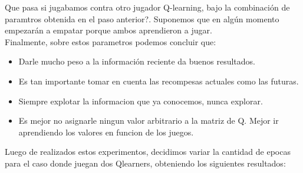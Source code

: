 Que pasa si jugabamos contra otro jugador Q-learning, bajo la combinación de paramtros obtenida en el paso anterior?.
 Suponemos que en algún momento empezarán a empatar porque ambos aprendieron a jugar.\\

Finalmente, sobre estos parametros podemos concluir que:
\begin{itemize}
  \item  Darle mucho peso a la información reciente da buenos resultados.
  \item  Es tan importante tomar en cuenta las recompesas actuales como las futuras.
  \item  Siempre explotar la informacion que ya conocemos, nunca explorar.
  \item  Es mejor no asignarle ningun valor arbitrario a la matriz de Q. Mejor ir aprendiendo los valores en funcion de
   los juegos.
\end{itemize}


Luego de realizados estos experimentos, decidimos variar la cantidad de epocas para el caso donde juegan dos Qlearners,
obteniendo los siguientes resultados:

